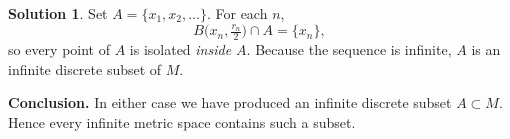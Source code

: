 \documentclass[12pt]{article}
\theoremstyle{definition} %
\newtheorem{solution}{Solution}
\theoremstyle{plain} %
\begin{document}
\begin{solution}
                  Set \(A=\{x_{1},x_{2},\dots\}\).
                  For each \(n\),
                  \[
                     B\!\bigl(x_{n},\tfrac{r_{n}}{2}\bigr)\cap A=\{x_{n}\},
                  \]
                  so every point of \(A\) is isolated \emph{inside \(A\)}.
                  Because the sequence is infinite, \(A\) is an infinite discrete subset
                  of \(M\).
                  
                  \medskip
                  \textbf{Conclusion.}  
                  In either case we have produced an infinite discrete subset \(A\subset
                  M\).  Hence every infinite metric space contains such a subset.
                  \end{solution}            
\end{document}
